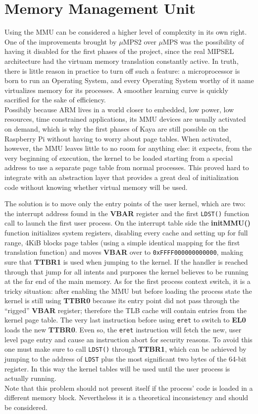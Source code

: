 \documentclass[12pt,a4paper,openright,twoside]{report}
\begin{document}
\section{Memory Management Unit}
Using the MMU can be considered a higher level of complexity in its own right.
One of the improvements brought by $\mu$MPS2 over $\mu$MPS was the possibility 
of having it disabled for the first phases of the project, since the real 
MIPSEL architecture had the virtuam memory translation constantly active.
In truth, there is little reason in practice to turn off such a feature: a microprocessor
is born to run an Operating System, and every Operating System worthy of it name
virtualizes memory for its processes. A smoother learning curve is quickly 
sacrified for the sake of efficiency.\\
Possibily because ARM lives in a world closer to embedded, low power, low resources,
time constrained applications, its MMU devices are usually activated on demand,
which is why the first phases of Kaya are still possible on the Raspberry Pi 
without having to worry about page tables.
When activated, however, the MMU leaves little to no room for anything else: it 
expects, from the very beginning of execution,
 the kernel to be loaded starting from a special address to use a separate
page table from normal processes. This proved hard to integrate with an abstraction
layer that provides a great deal of initialization code without knowing whether
virtual memory will be used.

The solution is to move only the entry points of the user kernel, which are
two: the interrupt address found in the \textbf{VBAR} register and the first
{\tt LDST()} function call to launch the first user process. 
On the interrupt table side the \textbf{initMMU()} function
initializes system registers, disabling every cache and setting up for full
range, 4KiB blocks page tables (using a simple identical mapping for the first
translation function) and moves \textbf{VBAR} over to {\tt 0xFFFF000000000000},
making sure that \textbf{TTBR1} is used when jumping to the kernel. If the handler
is reached through that jump for all intents and purposes the kernel believes to 
be running at the far end of the main memory.
As for the first process context switch, it is a tricky situation: after enabling
the MMU but before loading the process state the kernel is still using \textbf{TTBR0}
because its entry point did not pass through the ``rigged'' \textbf{VBAR} register;
therefore the TLB cache will contain entries from the kernel page table.
The very last instruction before using {\tt eret} to switch to \textbf{EL0} loads
the new \textbf{TTBR0}. Even so, the {\tt eret} instruction will fetch the
new, user level page entry and cause an instruction abort for security reasons.
To avoid this one must make sure to call {\tt LDST()} through \textbf{TTBR1},
which can be achieved by jumping to the address of {\tt LDST} plus the most significant
two bytes of the 64-bit register. In this way the kernel tables will be used 
until the user process is actually running.\\
Note that this problem should not present itself if the process' code is loaded
in a different memory block. Nevertheless it is a theoretical inconsistency and
should be considered.
\end{document}
